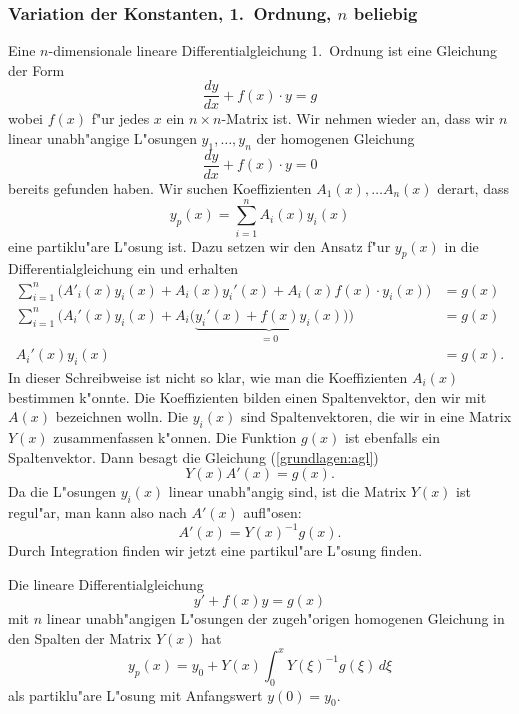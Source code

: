 \subsubsection{Variation der Konstanten, 1.~Ordnung, $n$ beliebig}
Eine $n$-dimensionale lineare Differentialgleichung 1.~Ordnung ist
eine Gleichung der Form
\[
\frac{dy}{dx}+f(x)\cdot y = g
\]
wobei $f(x)$ f"ur jedes $x$ ein $n\times n$-Matrix ist.
Wir nehmen wieder an, dass wir $n$ linear unabh"angige L"osungen
$y_1,\dots,y_n$ der homogenen Gleichung
\[
\frac{dy}{dx}+f(x)\cdot y=0
\]
bereits gefunden haben.
Wir suchen Koeffizienten $A_1(x),\dots A_n(x)$ derart, dass
\[
y_p(x)=\sum_{i=1}^n A_i(x)y_i(x)
\]
eine partiklu"are L"osung ist.
Dazu setzen wir den Ansatz f"ur $y_p(x)$ in die Differentialgleichung
ein und erhalten
\begin{align*}
\sum_{i=1}^n\biggl(
A'_i(x)y_i(x) + A_i(x)y_i'(x)
+
A_i(x)f(x)\cdot y_i(x)\biggr)
&=g
(x)
\\
\sum_{i=1}^n\biggl(
A_i'(x)y_i(x) + A_i\bigl(\underbrace{y_i'(x)+f(x)y_i(x)}_{=0}\bigr)
\biggr)
&=
g(x)
\\
A_i'(x)y_i(x)&=g(x).
\label{grundlagen:agl}
\end{align*}
In dieser Schreibweise ist nicht so klar, wie man die Koeffizienten
$A_i(x)$ bestimmen k"onnte.
Die Koeffizienten bilden einen Spaltenvektor, den wir mit
$A(x)$ bezeichnen wolln. Die $y_i(x)$ sind Spaltenvektoren, die wir
in eine Matrix $Y(x)$ zusammenfassen k"onnen.
Die Funktion $g(x)$ ist ebenfalls ein Spaltenvektor.
Dann besagt die Gleichung (\ref{grundlagen:agl})
\[
Y(x)A'(x)=g(x).
\]
Da die L"osungen $y_i(x)$ linear unabh"angig sind, ist die Matrix
$Y(x)$ ist regul"ar, man kann also nach $A'(x)$ aufl"osen:
\[
A'(x)=Y(x)^{-1}g(x).
\]
Durch Integration finden wir jetzt eine partikul"are L"osung finden.

\begin{satz}
Die lineare Differentialgleichung 
\[
y'+f(x)y=g(x)
\]
mit $n$ linear unabh"angigen L"osungen der zugeh"origen homogenen 
Gleichung in den Spalten der Matrix $Y(x)$ hat
\[
y_p(x)=y_0+Y(x)\int_0^x Y(\xi)^{-1}g(\xi)\,d\xi
\]
als partiklu"are L"osung mit Anfangswert $y(0)=y_0$.
\end{satz}

